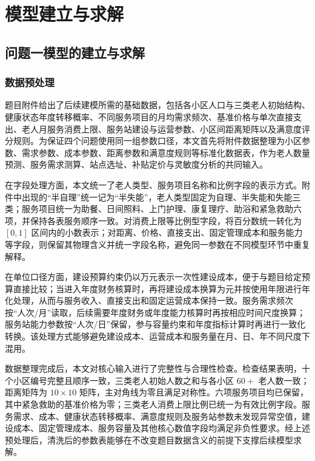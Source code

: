 \section{模型建立与求解}

\subsection{问题一模型的建立与求解}

\subsubsection{数据预处理}

题目附件给出了后续建模所需的基础数据，包括各小区人口与三类老人初始结构、健康状态年度转移概率、不同服务项目的月均需求频次、基准价格与单次直接支出、老人月服务消费上限、服务站建设与运营参数、小区间距离矩阵以及满意度评分规则。为保证四个问题使用同一组参数口径，本文首先将附件数据整理为小区参数、需求参数、成本参数、距离参数和满意度规则等标准化数据表，作为老人数量预测、服务需求测算、站点选址、补贴定价与灵敏度分析的共同输入。

在字段处理方面，本文统一了老人类型、服务项目名称和比例字段的表示方式。附件中出现的“半自理”统一记为“半失能”，老人类型固定为自理、半失能和失能三类；服务项目统一为助餐、日间照料、上门护理、康复理疗、助浴和紧急救助六项，并保持各表服务顺序一致。对消费上限等比例型字段，将百分数统一转化为 $[0,1]$ 区间内的小数表示；对距离、价格、直接支出、固定管理成本和服务能力等字段，则保留其物理含义并统一字段名称，避免同一参数在不同模型环节中重复解释。

在单位口径方面，建设预算约束仍以万元表示一次性建设成本，便于与题目给定预算直接比较；当进入年度财务核算时，再将建设成本换算为元并按使用年限进行年化处理，从而与服务收入、直接支出和固定运营成本保持一致。服务需求频次按“人次/月”读取，后续需要年度财务或年度能力核算时再按相应时间尺度换算；服务站能力参数按“人次/日”保留，参与容量约束和年度指标计算时再进行一致化转换。该处理方式能够避免建设成本、运营成本和服务量在月、日、年不同尺度下混用。

数据整理完成后，本文对核心输入进行了完整性与合理性检查。检查结果表明，十个小区编号完整且顺序一致，三类老人初始人数之和与各小区 $60+$ 老人数一致；距离矩阵为 $10\times10$ 矩阵，主对角线为零且满足对称性。六项服务项目均已保留，其中紧急救助的基准价格为零；三类老人消费上限比例已统一为有效比例字段。服务需求、成本、健康状态转移概率、满意度规则及服务站参数未发现异常空值，建设成本、固定管理成本、服务容量及其他核心数值字段均满足非负性要求。经上述预处理后，清洗后的参数表能够在不改变题目数据含义的前提下支撑后续模型求解。

